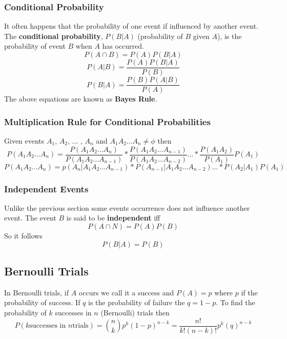 \documentclass{article}
\begin{document}
    \subsubsection{Conditional Probability}
    It often happens that the probability of one event if influenced by another event. The \textbf{conditional 
    probability}, $P(B|A)$ (probability of $B$ given $A$), is the probability of event $B$ when $A$ has occurred.
    \begin{equation}
        P(A \cap B) = P(A)P(B|A)
    \end{equation} 
    \begin{equation}
        P(A|B) = \frac{P(A)P(B|A)}{P(B)}
    \end{equation}
    \begin{equation}
        P(B|A) = \frac{P(B)P(A|B)}{P(A)}
    \end{equation}
    The above equations are known as \textbf{Bayes Rule}.
    
    \subsubsection{Multiplication Rule for Conditional Probabilities}
    Given events $A_1$, $A_2$, ... , $A_n$ and $A_1A_2$...$A_n \ne \phi$ then
    \begin{equation}
        P(A_1A_2...A_n) = \frac{P(A_1A_2...A_n)}{P(A_1A_2...A_{n-1})} *  
            \frac{P(A_1A_2...A_{n-1})}{P(A_1A_2...A_{n-2})} ... *  \frac{P(A_1A_2)}{P(A_1)}P(A_1)
    \end{equation}
    \begin{equation}
        P(A_1A_2...A_n) = p(A_n|A_1A_2...A_{n-1})*P(A_{n-1}|A_1A_2...A_{n-2})...*P(A_2|A_1)P(A_1)
    \end{equation}

    \subsubsection{Independent Events}
    Unlike the previous section some events occurrence does not influence another event. The event $B$ is 
    said to be \textbf{independent} iff
    \begin{equation}
        P(A\cap N) = P(A)P(B)
    \end{equation}
    So it follows
    \begin{equation}
        P(B|A) = P(B)
    \end{equation}

    \subsection{Bernoulli Trials}
    In Bernoulli trials, if $A$ occurs we call it a success and $P(A) = p$ where $p$ if the probability of 
    success. If $q$ is the probability of failure the $q=1-p$. To find the probability of $k$ successes in 
    $n$ (Bernoulli) trials then 
    \begin{equation}
        P(k \textrm{successes in } n \textrm{trials}) = \binom{n}{k}p^k(1-p)^{n-k} = \frac{n!}{k!(n-k)!}p^k(q)^{n-k}
    \end{equation}
\end{document}
